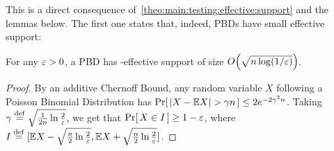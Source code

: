 This is a direct consequence of~\cref{theo:main:testing:effective:support} and the lemmas below. The first one states that, indeed, PBDs have small effective support:
\begin{fact}\label{fact:pbd:effective:support}
For any $\varepsilon > 0$, a PBD has \eps-effective support of size $\bigO{\sqrt{n\log(1/\eps)}}$.
\end{fact}
\begin{proof}
By an additive Chernoff Bound, any random variable $X$ following a Poisson Binomial Distribution has $\Pr\!\left[\, \left\lvert X-\mathbb{E} X \right\rvert > \gamma n\, \right] \leq 2e^{-2\gamma^2n}$. Taking $\gamma\stackrel{\rm def}{=}\sqrt{\frac{1}{2n}\ln\frac{2}{\varepsilon}}$, we get that $\Pr\!\left[\, X\in I\, \right] \geq 1-\varepsilon$, where $I\stackrel{\rm def}{=} [\mathbb{E} X-\sqrt{\frac{n}{2}\ln\frac{2}{\varepsilon}}, \mathbb{E} X+\sqrt{\frac{n}{2}\ln\frac{2}{\varepsilon}}]$.
\end{proof}

